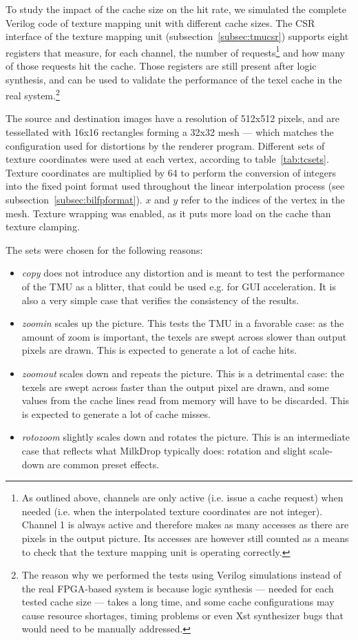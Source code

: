 \documentclass[a4paper,11pt]{kthesis}
\begin{document}
To study the impact of the cache size on the hit rate, we simulated the complete Verilog code of texture mapping unit with different cache sizes. The CSR interface of the texture mapping unit (subsection~\ref{subsec:tmucsr}) supports eight registers that measure, for each channel, the number of requests\footnote{As outlined above, channels are only active (i.e. issue a cache request) when needed (i.e. when the interpolated texture coordinates are not integer). Channel 1 is always active and therefore makes as many accesses as there are pixels in the output picture. Its accesses are however still counted as a means to check that the texture mapping unit is operating correctly.} and how many of those requests hit the cache. Those registers are still present after logic synthesis, and can be used to validate the performance of the texel cache in the real system.\footnote{The reason why we performed the tests using Verilog simulations instead of the real FPGA-based system is because logic synthesis --- needed for each tested cache size --- takes a long time, and some cache configurations may cause resource shortages, timing problems or even Xst synthesizer bugs that would need to be manually addressed.}

The source and destination images have a resolution of 512x512 pixels, and are tessellated with 16x16 rectangles forming a 32x32 mesh --- which matches the configuration used for distortions by the renderer program. Different sets of texture coordinates were used at each vertex, according to table~\ref{tab:tcsets}. Texture coordinates are multiplied by 64 to perform the conversion of integers into the fixed point format used throughout the linear interpolation process (see subsection~\ref{subsec:bilfpformat}). $x$ and $y$ refer to the indices of the vertex in the mesh. Texture wrapping was enabled, as it puts more load on the cache than texture clamping.

The sets were chosen for the following reasons:
\begin{itemize}
\item \textit{copy} does not introduce any distortion and is meant to test the performance of the TMU as a blitter, that could be used e.g. for GUI acceleration. It is also a very simple case that verifies the consistency of the results.
\item \textit{zoomin} scales up the picture. This tests the TMU in a favorable case: as the amount of zoom is important, the texels are swept across slower than output pixels are drawn. This is expected to generate a lot of cache hits.
\item \textit{zoomout} scales down and repeats the picture. This is a detrimental case: the texels are swept across faster than the output pixel are drawn, and some values from the cache lines read from memory will have to be discarded. This is expected to generate a lot of cache misses.
\item \textit{rotozoom} slightly scales down and rotates the picture. This is an intermediate case that reflects what MilkDrop typically does: rotation and slight scale-down are common preset effects.
\end{itemize}
\end{document}
